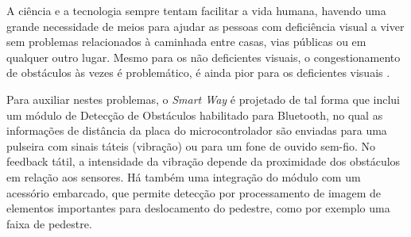 A ciência e a tecnologia sempre tentam facilitar a vida humana, havendo uma grande necessidade de meios para ajudar as pessoas com deficiência visual a viver sem problemas relacionados à caminhada entre casas, vias públicas ou em qualquer outro lugar. Mesmo para os não deficientes visuais, o congestionamento de obstáculos às vezes é
problemático, é ainda pior para os deficientes visuais \cite{Therib2017}.

Para auxiliar nestes problemas, o \textit{Smart Way} é projetado de tal forma que inclui um módulo de Detecção de Obstáculos habilitado para Bluetooth, no qual as informações de distância da placa do microcontrolador são enviadas para uma pulseira com sinais táteis (vibração) ou para um fone de ouvido sem-fio. No feedback tátil, a intensidade da vibração depende da proximidade dos obstáculos em relação aos sensores. Há também uma integração do módulo com um acessório embarcado, que permite detecção por processamento de imagem de elementos importantes para deslocamento do pedestre, como por exemplo uma faixa de pedestre.